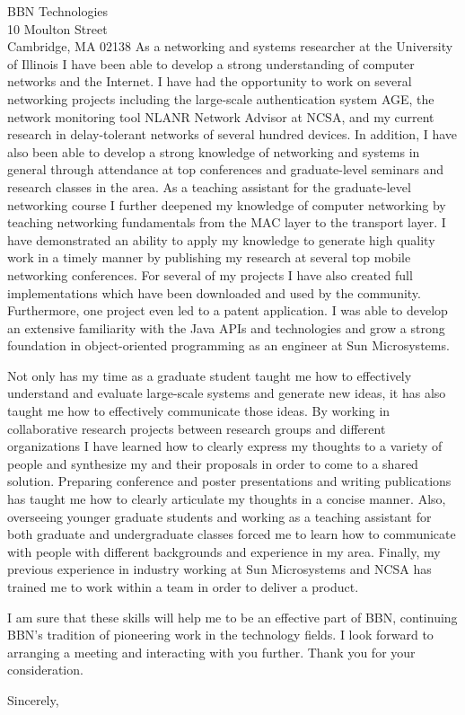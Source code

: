 \documentclass{letter}
\begin{document}
\begin{letter}{BBN Technologies\\10 Moulton Street\\Cambridge, MA 02138}
As a networking and systems researcher at the University of Illinois I
have been able to develop a strong understanding of computer networks and the
Internet.
I have had the opportunity to work
on several networking projects including the large-scale authentication system
AGE, the network monitoring tool NLANR Network Advisor at NCSA, and my current
research in delay-tolerant networks of several hundred devices.
In addition, I have also
been able to develop a strong knowledge of networking and systems in general
through attendance at top conferences and
graduate-level seminars and research classes in the area.
As a teaching assistant
for the graduate-level networking course 
I further deepened my knowledge of computer networking
by teaching networking
fundamentals from the MAC layer to the transport layer.
I have demonstrated an ability to apply my knowledge to generate high quality
work in a timely manner by publishing my research at several top mobile
networking conferences.  For several of my projects I have also created
full implementations
which have been downloaded and used by the community.  Furthermore, one project
even led to a patent application.
I was able to
develop an extensive familiarity with the Java APIs and technologies
and grow a strong foundation in object-oriented programming
as an engineer at Sun Microsystems.%



Not only has my time as a graduate student taught me how to effectively
understand and evaluate large-scale systems and generate new ideas,
it has also taught me how to effectively communicate those ideas.  
By working in collaborative research projects between research groups and
different organizations I have learned how to clearly express my thoughts to 
a variety of people and synthesize my and their proposals in
order to come to a shared solution.
Preparing conference and poster presentations and writing publications has
taught me how to clearly articulate my thoughts in a concise manner.
Also, overseeing younger graduate students and working as a teaching assistant
for
both graduate and undergraduate classes forced me to learn how to communicate
with people with different backgrounds and experience in my area.
Finally, my previous experience in industry working at Sun Microsystems and
NCSA has trained me to work within a team in order to deliver a product.


I am sure that these skills will help me to be an effective part of BBN,
continuing BBN's tradition of pioneering work in the technology fields.
I look forward to arranging a meeting and interacting with you further.  
Thank you for your consideration.

\closing{Sincerely,}
\end{letter}
\end{document}
